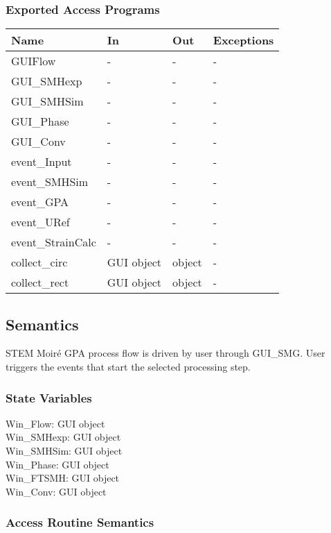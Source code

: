 \documentclass[12pt, titlepage]{article}
\newcommand{\progname}{STEM Moir{\'e} GPA}
\begin{document}
\subsubsection{Exported Access Programs}

\begin{center}
\begin{tabular}{p{4cm} p{2cm} p{2cm} p{2cm}}
\hline
\textbf{Name} & \textbf{In} & \textbf{Out} & \textbf{Exceptions} \\
\hline
GUIFlow & - & - & - \\
GUI{\_}SMHexp & - & - & - \\
GUI{\_}SMHSim & - & - & - \\
GUI{\_}Phase & - & - & - \\
GUI{\_}Conv & - & - & - \\
event{\_}Input & - & - & - \\
event{\_}SMHSim & - & - & - \\
event{\_}GPA & - & - & - \\
event{\_}URef & - & - & - \\
event{\_}StrainCalc & - & - & - \\
collect{\_}circ & GUI object & object & - \\
collect{\_}rect & GUI object & object & -\\
\hline
\end{tabular}
\end{center}

\subsection{Semantics}

\progname{} process flow is driven by user through GUI{\_}SMG. User triggers the events that start the selected processing step. 

\subsubsection{State Variables}

\noindent Win{\_}Flow: GUI object\\
Win{\_}SMHexp: GUI object\\
Win{\_}SMHSim: GUI object\\
Win{\_}Phase: GUI object\\
Win{\_}FTSMH: GUI object\\
Win{\_}Conv: GUI object\\


\subsubsection{Access Routine Semantics}
\end{document}
